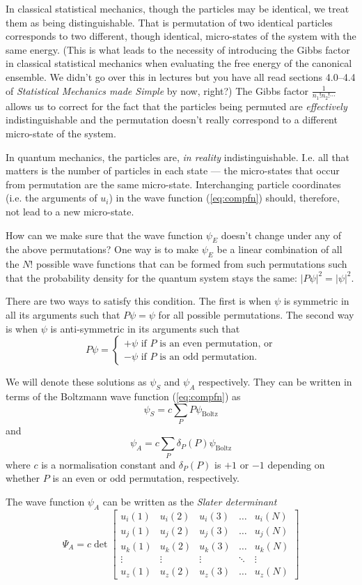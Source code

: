 \documentclass{article}
\begin{document}
In classical statistical mechanics, though the particles may be identical, we treat them as being distinguishable. That is permutation of two identical particles corresponds to two different, though identical, micro-states of the system with the same energy. (This is what leads to the necessity of introducing the Gibbs factor in classical statistical mechanics when evaluating the free energy of the canonical ensemble. We didn't go over this in lectures but you have all read sections 4.0--4.4 of \emph{Statistical Mechanics made Simple} by now, right?) The Gibbs factor $\frac{1}{n_1!n_2!\cdots}$ allows us to correct for the fact that the particles being permuted are \emph{effectively} indistinguishable and the permutation doesn't really correspond to a different micro-state of the system.

In quantum mechanics, the particles are, \emph{in reality} indistinguishable. I.e. all that matters is the number of particles in each state --- the micro-states that occur from permutation are the same micro-state.
Interchanging particle coordinates (i.e. the arguments of $u_i$) in the wave function (\ref{eq:compfn}) should, therefore, not lead to a new micro-state.

How can we make sure that the wave function $\psi_E$ doesn't change under any of the above permutations? One way is to make $\psi_E$ be a linear combination of all the $N!$ possible wave functions that can be formed from such permutations such that the probability density for the quantum system stays the same: $|P\psi|^2=|\psi|^2$.

There are two ways to satisfy this condition. The first is when $\psi$ is symmetric in all its arguments such that $P\psi = \psi$ for all possible permutations. The second way is when $\psi$ is anti-symmetric in its arguments such that
$$
	P\psi = 
	\begin{cases}
		+\psi \text{ if $P$ is an even permutation, or}\\
		-\psi \text{ if $P$ is an odd permutation.}
	\end{cases}
$$

We will denote these solutions as $\psi_S$ and $\psi_A$ respectively. They can be written in terms of the Boltzmann wave function (\ref{eq:compfn}) as
$$
	\psi_S=c\sum_P P\psi_\text{Boltz}
$$
and
$$
	\psi_A=c\sum_P \delta_P(P)\psi_\text{Boltz}
$$
where $c$ is a normalisation constant and $\delta_P(P)$ is $+1$ or $-1$ depending on whether $P$ is an even or odd permutation, respectively.

The wave function $\psi_A$ can be written as the \emph{Slater determinant} 
$$
	\Psi_A = c\det\begin{bmatrix}
		u_i(1) & u_i(2) & u_i(3) & \dots & u_i(N)\\
		u_j(1) & u_j(2) & u_j(3) & \dots & u_j(N)\\
		u_k(1) & u_k(2) & u_k(3) & \dots & u_k(N)\\
		\vdots & \vdots & \vdots & \ddots & \vdots \\
		u_z(1) & u_z(2) & u_z(3) & \dots & u_z(N)
	\end{bmatrix}
$$
\end{document}
